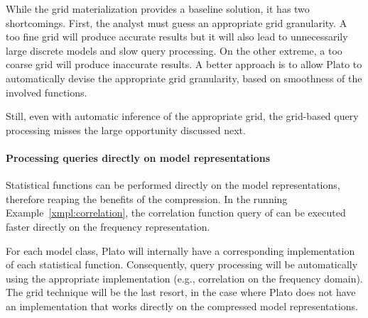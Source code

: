 While the grid materialization provides a baseline solution, it has two shortcomings. First, the analyst must guess an appropriate grid granularity. A too fine grid will produce accurate results but it will also lead to unnecessarily large discrete models and slow query processing. On the other extreme, a too coarse grid will produce inaccurate results. A better approach is to allow Plato to automatically devise the appropriate grid granularity, based on smoothness of the involved functions.

Still, even with automatic inference of the appropriate grid, the grid-based query processing misses the large opportunity discussed next.


\paragraph{Processing queries directly on model representations}
Statistical functions can be performed directly on the model representations, therefore reaping the benefits of the compression. In the running Example~\ref{xmpl:correlation}, the correlation function query of  can be executed faster directly on the frequency representation.%

For each model class, Plato will internally have a corresponding implementation of each statistical function. Consequently, query processing will be automatically using the appropriate implementation (e.g., correlation on the frequency domain). The grid technique will be the last resort, in the case where Plato does not have an implementation that works directly on the compressed model representations.


